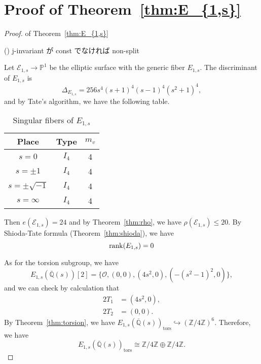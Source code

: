 \documentclass[main]{subfiles}
\begin{document}
\section{Proof of Theorem~\ref{thm:E_{1,s}}}

\begin{proof}{of Theorem~\ref{thm:E_{1,s}}}
    \begin{thm}{(\cite[Exercise 3.9.]{ref:advancedaec})}
        j-invariant が const でなければ non-split
    \end{thm}

    Let $\mathcal{E}_{1,s} \to \mathbb{P}^{1}$ be the elliptic surface with the generic fiber $E_{1,s}$.
    The discriminant of $E_{1,s}$ is
    \begin{equation*}
        \Delta_{E_{1,s}} = 256s^{4} (s + 1)^{4} (s - 1)^{4} (s^{2} + 1)^{4},
    \end{equation*}
    and by Tate's algorithm, we have the following table.
    \begin{table}[ht]
        \centering
        \caption{Singular fibers of $E_{1,s}$}
        \begin{tabular}{|c|c|c|}
            \hline
            Place             & Type  & $m_v$ \\
            \hline
            $s=0$             & $I_4$ & 4     \\
            $s=\pm 1$         & $I_4$ & 4     \\
            $s=\pm \sqrt{-1}$ & $I_4$ & 4     \\
            $s=\infty$        & $I_4$ & 4     \\
            \hline
        \end{tabular}
    \end{table}

    Then $e(\mathcal{E}_{1,s}) = 24$ and by Theorem~\ref{thm:rho}, we have $\rho(\mathcal{E}_{1,s}) \leq 20$.
    By Shioda-Tate formula (Theorem~\ref{thm:shioda}), we have
    \begin{equation*}
        \operatorname{rank}(E_{1,s}) = 0
    \end{equation*}

    As for the torsion subgroup, we have
    \begin{equation*}
        E_{1,s}(\overline{\mathbb{Q}}(s))[2] = \{\mathcal{O}, (0,0), (4s^{2},0),( - (s^{2} - 1)^{2},0)\},
    \end{equation*}
    and we can check by calculation that
    \begin{align}
        2T_1 & = (4s^2,0), \\
        2T_2 & = (0,0).
    \end{align}
    By Theorem~\ref{thm:torsion}, we have $E_{1,s}(\overline{\mathbb{Q}}(s))_ \text{tors} \hookrightarrow (\mathbb{Z} / 4 \mathbb{Z})^{6}$.
    Therefore, we have
    \begin{equation*}
        E_{1,s}(\overline{\mathbb{Q}}(s))_ \text{tors} \cong \mathbb{Z} / 4 \mathbb{Z} \oplus \mathbb{Z} / 4 \mathbb{Z}.
    \end{equation*}
\end{proof}
\end{document}
